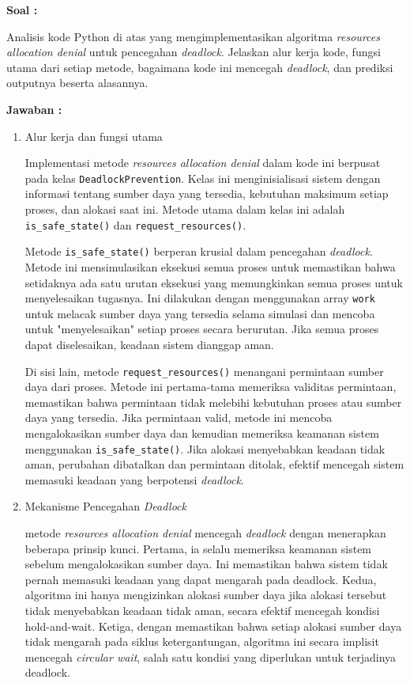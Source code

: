\documentclass[12pt]{article}
\begin{document}
\textbf{Soal :}

\par Analisis kode Python di atas yang mengimplementasikan algoritma \textit{resources allocation denial} untuk
pencegahan \textit{deadlock}. Jelaskan alur kerja kode, fungsi utama dari setiap metode,
bagaimana kode ini mencegah \textit{deadlock}, dan prediksi outputnya beserta alasannya.

\textbf{Jawaban :}

\begin{enumerate}
    \item Alur kerja dan fungsi utama
    
Implementasi metode \textit{resources allocation denial} dalam kode ini berpusat pada kelas \texttt{DeadlockPrevention}. Kelas ini menginisialisasi sistem dengan informasi tentang sumber daya yang tersedia, kebutuhan maksimum setiap proses, dan alokasi saat ini. Metode utama dalam kelas ini adalah \texttt{is\_safe\_state()} dan \texttt{request\_resources()}.

Metode \texttt{is\_safe\_state()} berperan krusial dalam pencegahan \textit{deadlock}. Metode ini mensimulasikan eksekusi semua proses untuk memastikan bahwa setidaknya ada satu urutan eksekusi yang memungkinkan semua proses untuk menyelesaikan tugasnya. Ini dilakukan dengan menggunakan array \texttt{work} untuk melacak sumber daya yang tersedia selama simulasi dan mencoba untuk "menyelesaikan" setiap proses secara berurutan. Jika semua proses dapat diselesaikan, keadaan sistem dianggap aman.

Di sisi lain, metode \texttt{request\_resources()} menangani permintaan sumber daya dari proses. Metode ini pertama-tama memeriksa validitas permintaan, memastikan bahwa permintaan tidak melebihi kebutuhan proses atau sumber daya yang tersedia. Jika permintaan valid, metode ini mencoba mengalokasikan sumber daya dan kemudian memeriksa keamanan sistem menggunakan \texttt{is\_safe\_state()}. Jika alokasi menyebabkan keadaan tidak aman, perubahan dibatalkan dan permintaan ditolak, efektif mencegah sistem memasuki keadaan yang berpotensi \textit{deadlock}.

\item Mekanisme Pencegahan \textit{Deadlock}

metode \textit{resources allocation denial} mencegah \textit{deadlock} dengan menerapkan beberapa prinsip kunci. Pertama, ia selalu memeriksa keamanan sistem sebelum mengalokasikan sumber daya. Ini memastikan bahwa sistem tidak pernah memasuki keadaan yang dapat mengarah pada deadlock. Kedua, algoritma ini hanya mengizinkan alokasi sumber daya jika alokasi tersebut tidak menyebabkan keadaan tidak aman, secara efektif mencegah kondisi {hold-and-wait}. Ketiga, dengan memastikan bahwa setiap alokasi sumber daya tidak mengarah pada siklus ketergantungan, algoritma ini secara implisit mencegah \textit{circular wait}, salah satu kondisi yang diperlukan untuk terjadinya deadlock.


\end{enumerate}
\end{document}
